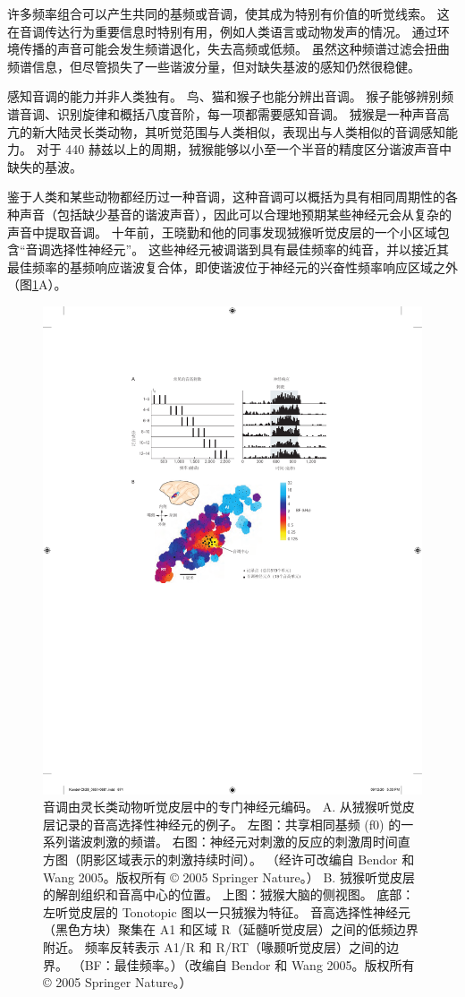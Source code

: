 许多频率组合可以产生共同的基频或音调，使其成为特别有价值的听觉线索。 
这在音调传达行为重要信息时特别有用，例如人类语言或动物发声的情况。 
通过环境传播的声音可能会发生频谱退化，失去高频或低频。 
虽然这种频谱过滤会扭曲频谱信息，但尽管损失了一些谐波分量，但对缺失基波的感知仍然很稳健。


感知音调的能力并非人类独有。 
鸟、猫和猴子也能分辨出音调。 
猴子能够辨别频谱音调、识别旋律和概括八度音阶，每一项都需要感知音调。 
狨猴是一种声音高亢的新大陆灵长类动物，其听觉范围与人类相似，表现出与人类相似的音调感知能力。 
对于 440 赫兹以上的周期，狨猴能够以小至一个半音的精度区分谐波声音中缺失的基波。


鉴于人类和某些动物都经历过一种音调，这种音调可以概括为具有相同周期性的各种声音（包括缺少基音的谐波声音），因此可以合理地预期某些神经元会从复杂的声音中提取音调。 
十年前，王晓勤和他的同事发现狨猴听觉皮层的一个小区域包含“音调选择性神经元”。 
这些神经元被调谐到具有最佳频率的纯音，并以接近其最佳频率的基频响应谐波复合体，即使谐波位于神经元的兴奋性频率响应区域之外（图\ref{fig:28_13}A）。

\begin{figure}[htbp]
	\centering
	\includegraphics[width=0.5\linewidth]{chap28/fig_28_13}
	\caption{音调由灵长类动物听觉皮层中的专门神经元编码。 
		A. 从狨猴听觉皮层记录的音高选择性神经元的例子。 左图：共享相同基频 (f0) 的一系列谐波刺激的频谱。 右图：神经元对刺激的反应的刺激周时间直方图（阴影区域表示的刺激持续时间）。 
		（经许可改编自 Bendor 和 Wang 2005。版权所有 © 2005 Springer Nature。） 
		B. 狨猴听觉皮层的解剖组织和音高中心的位置。 上图：狨猴大脑的侧视图。 
		底部：左听觉皮层的 Tonotopic 图以一只狨猴为特征。 
		音高选择性神经元（黑色方块）聚集在 A1 和区域 R（延髓听觉皮层）之间的低频边界附近。 
		频率反转表示 A1/R 和 R/RT（喙颞听觉皮层）之间的边界。 
		（BF：最佳频率。）（改编自 Bendor 和 Wang 2005。版权所有 © 2005 Springer Nature。）}
	\label{fig:28_13}
\end{figure}

